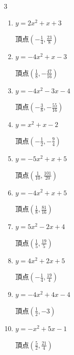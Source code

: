 \begin{multicols}{3}
\begin{enumerate}
        $\displaystyle 頂点\left( -\frac{5}{4} , -\frac{25}{8} \right)$

\columnbreak %

  \item $\displaystyle y=2x^{2}+x+3$

        $\displaystyle 頂点\left( -\frac{1}{4} , \frac{23}{8} \right)$

  \item $\displaystyle y=-4x^{2}+x-3$

        $\displaystyle 頂点\left( \frac{1}{8} , -\frac{47}{16} \right)$

  \item $\displaystyle y=-4x^{2}-3x-4$

        $\displaystyle 頂点\left( -\frac{3}{8} , -\frac{55}{16} \right)$

  \item $\displaystyle y=x^{2}+x-2$

        $\displaystyle 頂点\left( -\frac{1}{2} , -\frac{9}{4} \right)$

  \item $\displaystyle y=-5x^{2}+x+5$

        $\displaystyle 頂点\left( \frac{1}{10} , \frac{101}{20} \right)$

\columnbreak %

  \item $\displaystyle y=-4x^{2}+x+5$

        $\displaystyle 頂点\left( \frac{1}{8} , \frac{81}{16} \right)$

  \item $\displaystyle y=5x^{2}-2x+4$

        $\displaystyle 頂点\left( \frac{1}{5} , \frac{19}{5} \right)$

  \item $\displaystyle y=4x^{2}+2x+5$

        $\displaystyle 頂点\left( -\frac{1}{4} , \frac{19}{4} \right)$

  \item $\displaystyle y=-4x^{2}+4x-4$

        $\displaystyle 頂点\left( \frac{1}{2} , -3 \right)$

  \item $\displaystyle y=-x^{2}+5x-1$

        $\displaystyle 頂点\left( \frac{5}{2} , \frac{21}{4} \right)$

\columnbreak %

\resetques


\end{enumerate}
\end{multicols}

